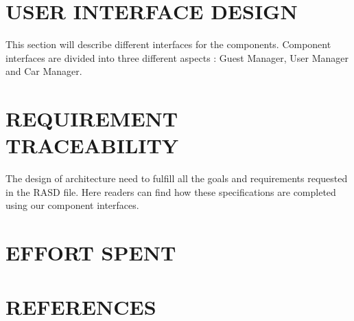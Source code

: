 \documentclass{article}
\begin{document}
	\section{USER INTERFACE DESIGN}
	This section will describe different interfaces for the components. Component interfaces are divided into three different aspects : Guest Manager, User Manager and Car Manager.
	
	\newpage
	\section{REQUIREMENT TRACEABILITY}
	The design of architecture need to fulfill all the goals and requirements requested in the RASD file. Here readers can find how these specifications are completed using our component interfaces. 
	\newpage
	\section{EFFORT SPENT}
	\newpage
	\section{REFERENCES}
\end{document}
